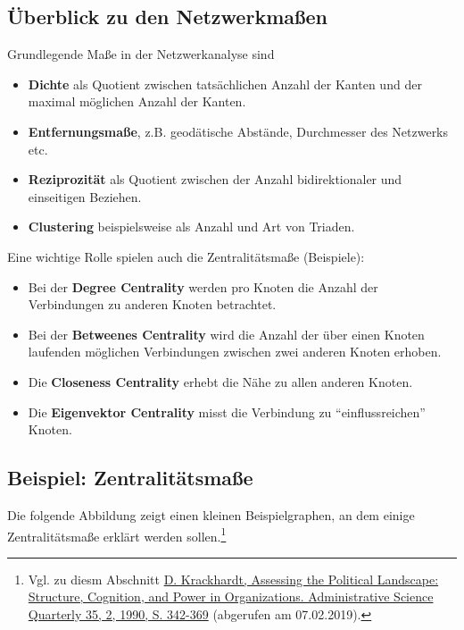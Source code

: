 \documentclass[ngerman,]{scrreprt}
\providecommand{\tightlist}{%
  \setlength{\itemsep}{0pt}\setlength{\parskip}{0pt}}
\begin{document}
\subsection{Überblick zu den Netzwerkmaßen}\label{uxfcberblick-zu-den-netzwerkmauxdfen}

Grundlegende Maße in der Netzwerkanalyse sind

\begin{itemize}
\tightlist
\item
  \textbf{Dichte} als Quotient zwischen tatsächlichen Anzahl der Kanten und der maximal möglichen Anzahl der Kanten.
\item
  \textbf{Entfernungsmaße}, z.B. geodätische Abstände, Durchmesser des Netzwerks etc.
\item
  \textbf{Reziprozität} als Quotient zwischen der Anzahl bidirektionaler und einseitigen Beziehen.
\item
  \textbf{Clustering} beispielsweise als Anzahl und Art von Triaden.
\end{itemize}

Eine wichtige Rolle spielen auch die Zentralitätsmaße (Beispiele):

\begin{itemize}
\tightlist
\item
  Bei der \textbf{Degree Centrality} werden pro Knoten die Anzahl der Verbindungen zu anderen Knoten betrachtet.
\item
  Bei der \textbf{Betweenes Centrality} wird die Anzahl der über einen Knoten laufenden möglichen Verbindungen zwischen zwei anderen Knoten erhoben.
\item
  Die \textbf{Closeness Centrality} erhebt die Nähe zu allen anderen Knoten.
\item
  Die \textbf{Eigenvektor Centrality} misst die Verbindung zu ``einflussreichen'' Knoten.
\end{itemize}

\subsection{Beispiel: Zentralitätsmaße}\label{beispiel-zentralituxe4tsmauxdfe}

Die folgende Abbildung zeigt einen kleinen Beispielgraphen, an dem einige Zentralitätsmaße erklärt werden sollen.\footnote{Vgl. zu diesm Abschnitt \href{https://www.jstor.org/stable/2393394?origin=crossref\&seq=1\#metadata_info_tab_contents}{D. Krackhardt, Assessing the Political Landscape: Structure, Cognition, and Power in Organizations. Administrative Science Quarterly 35, 2, 1990, S. 342-369} (abgerufen am 07.02.2019).}
\end{document}
